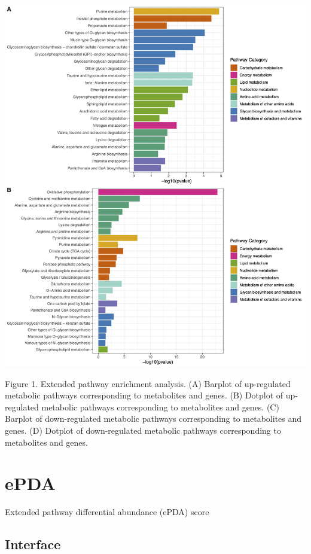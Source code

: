 \documentclass[
]{book}
\begin{document}
\begin{center}\includegraphics[width=70.83in]{figure/2.ePEA} \end{center}

Figure 1. Extended pathway enrichment analysis. (A) Barplot of up-regulated metabolic pathways corresponding to metabolites and genes. (B) Dotplot of up-regulated metabolic pathways corresponding to metabolites and genes. (C) Barplot of down-regulated metabolic pathways corresponding to metabolites and genes. (D) Dotplot of down-regulated metabolic pathways corresponding to metabolites and genes.

\section{ePDA}\label{epda}

Extended pathway differential abundance (ePDA) score

\subsection{Interface}\label{interface-2}
\end{document}
